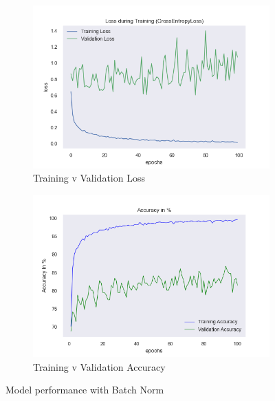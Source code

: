 \documentclass[a4paper]{article}
\begin{document}
\begin{figure}[H]
\centering
\begin{subfigure}{0.5\textwidth}
  \centering
  \includegraphics[width=1\linewidth]{img/baptiste/baptiste_100epoches_val_loss__Dropouts_False__BatchNorm_True.png}
  \caption{Training v Validation Loss}
  \label{fig:sub1}
\end{subfigure}%
\begin{subfigure}{0.5\textwidth}
  \centering
  \includegraphics[width=1\linewidth]{img/baptiste/baptiste_100epoches_train_accuracy__Dropouts_False__BatchNorm_True.png}
  \caption{Training v Validation Accuracy}
  \label{fig:sub2}
\end{subfigure}
\caption{Model performance with Batch Norm}
\label{fig:test}
\end{figure}
\end{document}
